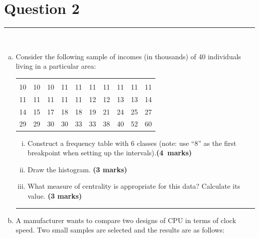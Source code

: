 \documentclass[12pt]{article}
\begin{document}
\section*{Question 2 }
\noindent\rule{\linewidth}{1pt}
\quad\\[-0.5cm]
\begin{enumerate}[a)]
\item Consider the following sample of incomes (in thousands) of 40 individuals living in a particular area:\\[-0.6cm]
    \begin{center}
    \begin{tabular}{|cccccccccc|}
    \hline
    &&&&&&&&&\\[-0.3cm]
    10 & 10 & 10 & 11 & 11 & 11 & 11 & 11 & 11 & 11 \\[0.1cm]
    11 & 11 & 11 & 11 & 11 & 12 & 12 & 13 & 13 & 14 \\[0.1cm]
    14 & 15 & 17 & 18 & 18 & 19 & 21 & 24 & 25 & 27 \\[0.1cm]
    29 & 29 & 30 & 30 & 33 & 33 & 38 & 40 & 52 & 60 \\[0.1cm]
    \hline
    \end{tabular}
    \end{center}
    \begin{enumerate}[i)]\itemsep0.3cm
    \item Construct a frequency table with 6 classes (note: use ``8'' as the first breakpoint when setting up the intervals).\hfill{\mbox{\scriptsize \bf (4 marks)}}
    \item Draw the histogram. \hfill{\scriptsize \bf (3 marks)}
    \item What measure of centrality is appropriate for this data? Calculate its value. \hfill{\scriptsize \bf (3 marks)}
    \end{enumerate}
\begin{center}\noindent\rule{0.4\linewidth}{0.5pt}\end{center}
\item A manufacturer wants to compare two designs of CPU in terms of clock speed. Two small samples are selected and the results are as follows:

\end{enumerate}
\end{document}
